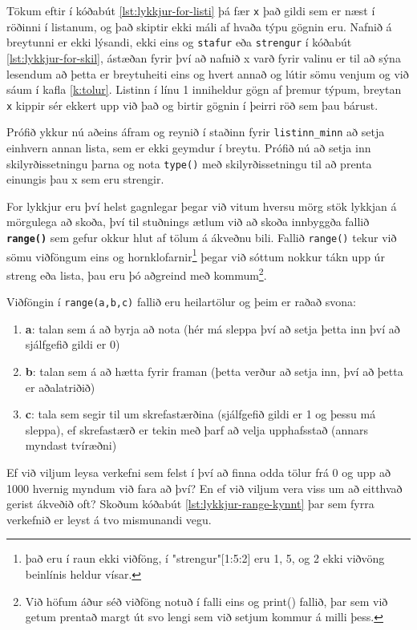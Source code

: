 \lstset{style=venjulegt}

Tökum eftir í kóðabút \ref{lst:lykkjur-for-listi} þá fær \texttt{x} það gildi sem er næst í röðinni í listanum, og það skiptir ekki máli af hvaða týpu gögnin eru.
Nafnið á breytunni er ekki lýsandi, ekki eins og \texttt{stafur} eða \texttt{strengur} í kóðabút \ref{lst:lykkjur-for-skil}, ástæðan fyrir því að nafnið x varð fyrir valinu er til að sýna lesendum að þetta er breytuheiti eins og hvert annað og lútir sömu venjum og við sáum í kafla \ref{k:tolur}.
Listinn í línu 1 inniheldur gögn af þremur týpum, breytan \texttt{x} kippir sér ekkert upp við það og birtir gögnin í þeirri röð sem þau bárust.

Prófið ykkur nú aðeins áfram og reynið í staðinn fyrir \texttt{listinn\_minn} að setja einhvern annan lista, sem er ekki geymdur í breytu.
Prófið nú að setja inn skilyrðissetningu þarna og nota \texttt{type()} með skilyrðissetningu til að prenta einungis þau x sem eru strengir.

For lykkjur eru því helst gagnlegar þegar við vitum hversu mörg stök lykkjan á mörgulega að skoða, því til stuðnings ætlum við að skoða innbyggða fallið \textbf{\texttt{range()}} sem gefur okkur hlut af tölum á ákveðnu bili.
Fallið \texttt{range()} tekur við sömu viðföngum eins og hornklofarnir\footnote{það eru í raun ekki viðföng, í "strengur"[1:5:2] eru 1, 5, og 2 ekki viðvöng beinlínis heldur vísar.} þegar við sóttum nokkur tákn upp úr streng eða lista, þau eru þó aðgreind með kommum\footnote{Við höfum áður séð viðföng notuð í falli eins og print() fallið, þar sem við getum prentað margt út svo lengi sem við setjum kommur á milli þess.}.

Viðföngin í \texttt{range(a,b,c)} fallið eru heilartölur og þeim er raðað svona:

\begin{enumerate}
	\item \textbf{a}: talan sem á að byrja að nota (hér má sleppa því að setja þetta inn því að sjálfgefið gildi er 0)
	\item \textbf{b}: talan sem á að hætta fyrir framan (þetta verður að setja inn, því að þetta er aðalatriðið)
	\item \textbf{c}: tala sem segir til um skrefastærðina (sjálfgefið gildi er 1 og þessu má sleppa), ef skrefastærð er tekin með þarf að velja upphafsstað (annars myndast tvíræðni)
\end{enumerate}

Ef við viljum leysa verkefni sem felst í því að finna odda tölur frá 0 og upp að 1000 hvernig myndum við fara að því?
En ef við viljum vera viss um að eitthvað gerist ákveðið oft?
Skoðum kóðabút \ref{lst:lykkjur-range-kynnt} þar sem fyrra verkefnið er leyst á tvo mismunandi vegu.

